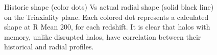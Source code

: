 \begin{figure}[!ht]
  \centering
  \hfill
  \caption{Historic shape (color dots) Vs actual radial shape (solid black line) on the Triaxiality plane. Each colored dot represents a calculated shape at R Mean 200, for each redshift. It is clear that halos with memory, unlike disrupted halos, have correlation between their historical and radial profiles.}
\end{figure}







 
